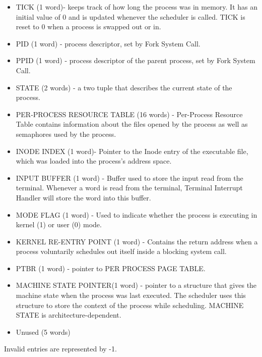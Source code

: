 \begin {itemize}

\item TICK (1 word)- keeps track of how long the process was in memory. It has an initial value of 0 and is updated whenever the scheduler is called. TICK is reset to 0 when a process is swapped out or in.
\item PID (1 word) - process descriptor, set by Fork System Call.
\item PPID (1 word) - process descriptor of the parent process, set by Fork System Call.
\item STATE (2 words) - a two tuple that describes the current state of the process.
\item PER-PROCESS RESOURCE TABLE (16 words) - Per-Process Resource Table contains information about the files opened by the process as well as semaphores used by the process.
\item INODE INDEX (1 word)- Pointer to the Inode entry of the executable file, which was loaded into the process's address space.
\item INPUT BUFFER (1 word) - Buffer used to store the input read from the terminal. Whenever a word is read from the terminal, Terminal Interrupt Handler will store the word into this buffer.
\item MODE FLAG (1 word) - Used to indicate whether the process is executing in kernel (1) or user (0) mode. 
\item KERNEL RE-ENTRY POINT (1 word) - Contains the return address when a process voluntarily schedules out itself inside a blocking system call.
\item PTBR (1 word) - pointer to PER PROCESS PAGE TABLE.
\item MACHINE STATE POINTER(1 word) - pointer to a structure that gives the machine state when the process was last executed. The scheduler uses this structure to store the context of the process while scheduling. MACHINE STATE is architecture-dependent.
\item Unused (5 words)
\end {itemize}
Invalid entries are represented by -1.

